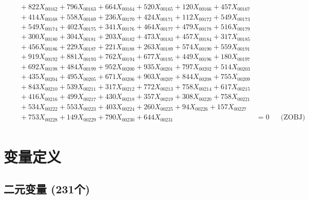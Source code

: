 \documentclass[a4paper,10pt]{article}
\begin{document}
{\begin{align}
&\quad  + 822X_{00162} + 796X_{00163} + 664X_{00164} + 520X_{00165} + 120X_{00166} + 457X_{00167} \\[0.5ex]
&\quad  + 414X_{00168} + 558X_{00169} + 236X_{00170} + 424X_{00171} + 112X_{00172} + 549X_{00173} \\[0.5ex]
&\quad  + 549X_{00174} + 402X_{00175} + 341X_{00176} + 464X_{00177} + 479X_{00178} + 516X_{00179} \\[0.5ex]
&\quad  + 300X_{00180} + 304X_{00181} + 203X_{00182} + 473X_{00183} + 457X_{00184} + 317X_{00185} \\[0.5ex]
&\quad  + 456X_{00186} + 229X_{00187} + 221X_{00188} + 263X_{00189} + 574X_{00190} + 559X_{00191} \\[0.5ex]
&\quad  + 919X_{00192} + 881X_{00193} + 762X_{00194} + 677X_{00195} + 449X_{00196} + 180X_{00197} \\[0.5ex]
&\quad  + 692X_{00198} + 484X_{00199} + 952X_{00200} + 935X_{00201} + 797X_{00202} + 514X_{00203} \\[0.5ex]
&\quad  + 435X_{00204} + 495X_{00205} + 671X_{00206} + 903X_{00207} + 844X_{00208} + 755X_{00209} \\[0.5ex]
&\quad  + 843X_{00210} + 539X_{00211} + 317X_{00212} + 772X_{00213} + 758X_{00214} + 617X_{00215} \\[0.5ex]
&\quad  + 416X_{00216} + 499X_{00217} + 430X_{00218} + 357X_{00219} + 308X_{00220} + 758X_{00221} \\[0.5ex]
&\quad  + 534X_{00222} + 553X_{00223} + 403X_{00224} + 260X_{00225} + 94X_{00226} + 157X_{00227} \\[0.5ex]
&\quad  + 753X_{00228} + 149X_{00229} + 790X_{00230} + 644X_{00231} &= 0 && \text{(ZOBJ)} \\
\end{align}}

\section{变量定义}

\subsection{二元变量 (231个)}
\end{document}
